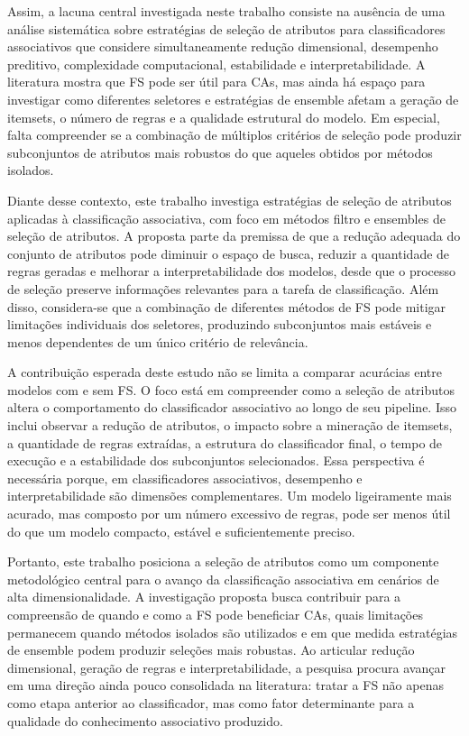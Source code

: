 Assim, a lacuna central investigada neste trabalho consiste na ausência de uma análise sistemática sobre estratégias de seleção de atributos para classificadores associativos que considere simultaneamente redução dimensional, desempenho preditivo, complexidade computacional, estabilidade e interpretabilidade. A literatura mostra que FS pode ser útil para CAs, mas ainda há espaço para investigar como diferentes seletores e estratégias de ensemble afetam a geração de itemsets, o número de regras e a qualidade estrutural do modelo. Em especial, falta compreender se a combinação de múltiplos critérios de seleção pode produzir subconjuntos de atributos mais robustos do que aqueles obtidos por métodos isolados.

Diante desse contexto, este trabalho investiga estratégias de seleção de atributos aplicadas à classificação associativa, com foco em métodos filtro e ensembles de seleção de atributos. A proposta parte da premissa de que a redução adequada do conjunto de atributos pode diminuir o espaço de busca, reduzir a quantidade de regras geradas e melhorar a interpretabilidade dos modelos, desde que o processo de seleção preserve informações relevantes para a tarefa de classificação. Além disso, considera-se que a combinação de diferentes métodos de FS pode mitigar limitações individuais dos seletores, produzindo subconjuntos mais estáveis e menos dependentes de um único critério de relevância.

A contribuição esperada deste estudo não se limita a comparar acurácias entre modelos com e sem FS. O foco está em compreender como a seleção de atributos altera o comportamento do classificador associativo ao longo de seu pipeline. Isso inclui observar a redução de atributos, o impacto sobre a mineração de itemsets, a quantidade de regras extraídas, a estrutura do classificador final, o tempo de execução e a estabilidade dos subconjuntos selecionados. Essa perspectiva é necessária porque, em classificadores associativos, desempenho e interpretabilidade são dimensões complementares. Um modelo ligeiramente mais acurado, mas composto por um número excessivo de regras, pode ser menos útil do que um modelo compacto, estável e suficientemente preciso.

Portanto, este trabalho posiciona a seleção de atributos como um componente metodológico central para o avanço da classificação associativa em cenários de alta dimensionalidade. A investigação proposta busca contribuir para a compreensão de quando e como a FS pode beneficiar CAs, quais limitações permanecem quando métodos isolados são utilizados e em que medida estratégias de ensemble podem produzir seleções mais robustas. Ao articular redução dimensional, geração de regras e interpretabilidade, a pesquisa procura avançar em uma direção ainda pouco consolidada na literatura: tratar a FS não apenas como etapa anterior ao classificador, mas como fator determinante para a qualidade do conhecimento associativo produzido.

